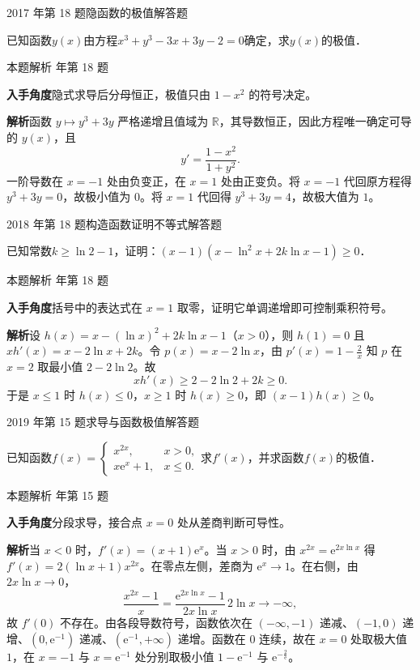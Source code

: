 \documentclass[UTF8,zihao=-4,fontset=fandol]{ctexart}
\newcommand{\QuestionPage}[6]{%
  \par\noindent\begin{minipage}{\linewidth}
  \raggedright
  {\small\textcolor{black!60}{#3\quad #5}\hfill\textcolor{accent}{#2}}\par\smallskip}
\newcommand{\QuestionEnd}{\end{minipage}\par\medskip}
\newcommand{\QuestionPage}[6]{%
  \clearpage
  {\small\textcolor{accent}{#1\hfill #2}}\par\medskip
  {\small\textcolor{black!60}{#3\quad #5\hfill #6}}\par\vspace{9bp}}
\newcommand{\QuestionEnd}{}
\newenvironment{QuestionSolution}[1]{%
  \clearpage
  {\small\textcolor{black!60}{本题解析\quad #1}}\par\medskip
}{\par\clearpage}
\begin{document}
\QuestionPage{2.6 函数性态的研究}{解答题}{2017 年第 18 题}{3}{隐函数的极值}{124 / 234}
已知函数$y(x)$由方程$x^3 + y^3 - 3x + 3y - 2 = 0$确定，求$y(x)$的极值．
\QuestionEnd

\begin{QuestionSolution}{2017 年第 18 题}
\textbf{入手角度}\quad 隐式求导后分母恒正，极值只由 \(1-x^2\) 的符号决定。

\textbf{解析}\quad 函数 \(y\mapsto y^3+3y\) 严格递增且值域为 \(\mathbb R\)，其导数恒正，因此方程唯一确定可导的 \(y(x)\)，且
\[
y'=\frac{1-x^2}{1+y^2}.
\]
一阶导数在 \(x=-1\) 处由负变正，在 \(x=1\) 处由正变负。将 \(x=-1\) 代回原方程得 \(y^3+3y=0\)，故极小值为 \(0\)。将 \(x=1\) 代回得 \(y^3+3y=4\)，故极大值为 \(1\)。
\end{QuestionSolution}

\QuestionPage{2.6 函数性态的研究}{解答题}{2018 年第 18 题}{3}{构造函数证明不等式}{125 / 234}
已知常数$k \ge \ln 2 - 1$，证明：$(x - 1)\left(x - \ln^2 x + 2k\ln x - 1 \right) \ge 0$．
\QuestionEnd

\begin{QuestionSolution}{2018 年第 18 题}
\textbf{入手角度}\quad 括号中的表达式在 \(x=1\) 取零，证明它单调递增即可控制乘积符号。

\textbf{解析}\quad 设 \(h(x)=x-(\ln x)^2+2k\ln x-1\)（\(x>0\)），则 \(h(1)=0\) 且 \(xh'(x)=x-2\ln x+2k\)。令 \(p(x)=x-2\ln x\)，由 \(p'(x)=1-\frac{2}{x}\) 知 \(p\) 在 \(x=2\) 取最小值 \(2-2\ln2\)。故
\[
xh'(x)\ge 2-2\ln2+2k\ge 0.
\]
于是 \(x\le1\) 时 \(h(x)\le0\)，\(x\ge1\) 时 \(h(x)\ge0\)，即 \((x-1)h(x)\ge0\)。
\end{QuestionSolution}

\QuestionPage{2.6 函数性态的研究}{解答题}{2019 年第 15 题}{2}{求导与函数极值}{126 / 234}
已知函数$f(x) = \begin{cases}
     x^{2x}, & x > 0, \\
  x\mathrm{e}^x + 1, & x \le 0.
\end{cases}$求$f'(x)$，并求函数$f(x)$的极值．
\QuestionEnd

\begin{QuestionSolution}{2019 年第 15 题}
\textbf{入手角度}\quad 分段求导，接合点 \(x=0\) 处从差商判断可导性。

\textbf{解析}\quad 当 \(x<0\) 时，\(f'(x)=(x+1)\mathrm{e}^x\)。当 \(x>0\) 时，由 \(x^{2x}=\mathrm{e}^{2x\ln x}\) 得 \(f'(x)=2(\ln x+1)x^{2x}\)。在零点左侧，差商为 \(\mathrm{e}^x\to1\)。在右侧，由 \(2x\ln x\to0\)，
\[
\frac{x^{2x}-1}{x}
=\frac{\mathrm{e}^{2x\ln x}-1}{2x\ln x}\,2\ln x\longrightarrow-\infty,
\]
故 \(f'(0)\) 不存在。由各段导数符号，函数依次在 \((-\infty,-1)\) 递减、\((-1,0)\) 递增、\((0,\mathrm{e}^{-1})\) 递减、\((\mathrm{e}^{-1},+\infty)\) 递增。函数在 \(0\) 连续，故在 \(x=0\) 处取极大值 \(1\)，在 \(x=-1\) 与 \(x=\mathrm{e}^{-1}\) 处分别取极小值 \(1-\mathrm{e}^{-1}\) 与 \(\mathrm{e}^{-\frac{2}{\mathrm{e}}}\)。
\end{QuestionSolution}
\end{document}

